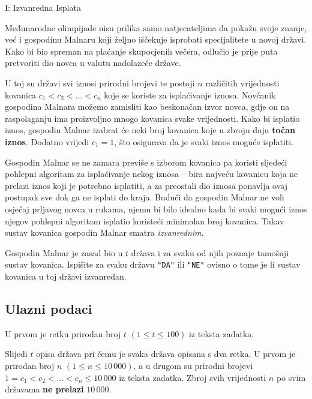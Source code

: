 \begin{statement}[
  timelimit=1 s,
  memorylimit=512 MiB,
]{I: Izvanredna Isplata}

Međunarodne olimpijade nisu prilika samo natjecateljima da pokažu svoje znanje,
već i gospodinu Malnaru koji željno iščekuje isprobati specijalitete u novoj
državi. Kako bi bio spreman na plaćanje skupocjenih večera, odlučio je prije
puta pretvoriti dio novca u valutu nadolazeće države.

U toj su državi svi iznosi prirodni brojevi te postoji $n$ različitih
vrijednosti kovanica $c_1 < c_2 < \ldots < c_n$ koje se koriste za
isplaćivanje iznosa. Novčanik gospodina Malnara možemo zamisliti kao
beskonačan izvor novca, gdje on na raspolaganju ima proizvoljno mnogo
kovanica svake vrijednosti. Kako bi isplatio iznos, gospodin Malnar izabrat
će neki broj kovanica koje u zbroju daju \textbf{točan iznos}. Dodatno
vrijedi $c_1 = 1$, što osigurava da je svaki iznos moguće isplatiti.

Gospodin Malnar se ne zamara previše s izborom kovanica pa koristi sljedeći
pohlepni algoritam za isplaćivanje nekog iznosa -- bira najveću kovanicu koja
ne prelazi iznos koji je potrebno isplatiti, a za preostali dio iznosa
ponavlja ovaj postupak sve dok ga ne isplati do kraja. Budući da gospodin
Malnar ne voli osjećaj prljavog novca u rukama, njemu bi bilo idealno kada bi
svaki mogući iznos njegov pohlepni algoritam isplatio koristeći minimalan
broj kovanica. Takav sustav kovanica gospodin Malnar smatra
\textit{izvanrednim}.

Gospodin Malnar je zasad bio u $t$ država i za svaku od njih poznaje tamošnji
sustav kovanica. Ispišite za svaku državu \texttt{"DA"} ili \texttt{"NE"}
ovisno o tome je li sustav kovanica u toj državi izvanredan.

\subsection*{Ulazni podaci}
U prvom je retku prirodan broj $t$ $(1 \le t \le 100)$ iz teksta zadatka.

Slijedi $t$ opisa država pri čemu je svaka država opisana s dva retka. U prvom
je prirodan broj $n$ $(1 \le n \le 10\,000)$, a u drugom su
prirodni brojevi $1 = c_1 < c_2 < \dots < c_n \le 10\,000$ iz teksta zadatka.
Zbroj svih vrijednosti $n$ po svim državama \textbf{ne prelazi} $10\,000$.


\end{statement}
